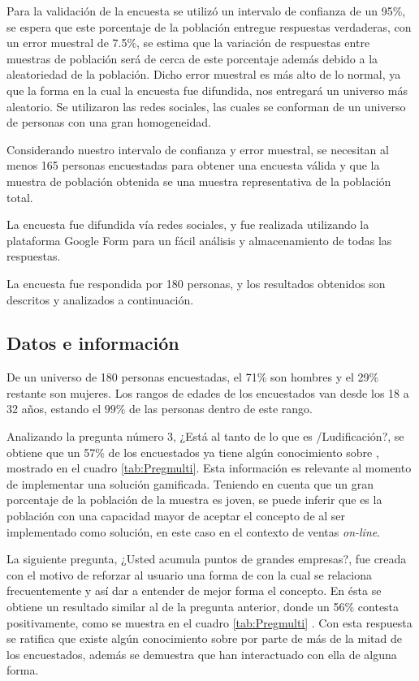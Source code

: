 Para la validación de la encuesta se utilizó un intervalo de confianza de un 95\%,
se espera que este porcentaje de la población entregue respuestas verdaderas,
con un error muestral de 7.5\%, se estima que la variación de respuestas entre
muestras de población será de cerca de este porcentaje además debido a la
aleatoriedad de la población.
Dicho error muestral es más alto de lo normal, ya que la forma en la cual la
encuesta fue difundida, nos entregará un universo más aleatorio.
Se utilizaron las redes sociales, las cuales se conforman de un universo de personas
con una gran homogeneidad.

Considerando nuestro intervalo de confianza y error muestral,
se necesitan al menos 165 personas encuestadas para obtener una encuesta válida
y que la muestra de población obtenida se una muestra representativa de la
población total.

La encuesta fue difundida vía redes sociales, y fue realizada utilizando la plataforma Google 
Form para un fácil análisis y almacenamiento de todas las respuestas.

La encuesta fue respondida por 180 personas, y los resultados obtenidos son
descritos y analizados a continuación.

\subsection{Datos e información}

De un universo de 180 personas encuestadas, el 71\% son hombres y el 29\%
restante son mujeres.
Los rangos de edades de los encuestados van desde los 18 a 32 años,
estando el $99\%$ de las personas dentro de este rango.

Analizando la pregunta número $3$, ¿Está al tanto de lo que es {\gam}/Ludificación?, se obtiene que  un 57\% 
de los encuestados ya tiene algún conocimiento sobre {\gam}, mostrado en el cuadro \ref{tab:Pregmulti}.
Esta información es relevante al momento de implementar una solución gamificada.
Teniendo en cuenta que un gran porcentaje de la población de la muestra es joven,
se puede inferir que es la población con una capacidad mayor de aceptar el
concepto de {\gam} al ser implementado como solución, en este caso en el
contexto de ventas \emph{on-line}.

La siguiente pregunta,
¿Usted acumula puntos de grandes empresas?, fue creada con el motivo de reforzar
al usuario una forma de {\gam} con la cual se relaciona frecuentemente y así dar
a entender de mejor forma el concepto.
En ésta se obtiene un resultado similar al de la pregunta anterior,
donde un 56\% contesta positivamente, como se muestra en el cuadro \ref{tab:Pregmulti} .
Con esta respuesta se ratifica que existe algún conocimiento sobre {\gam} por parte
de más de la mitad de los encuestados, además se demuestra que han interactuado con
ella de alguna forma.

